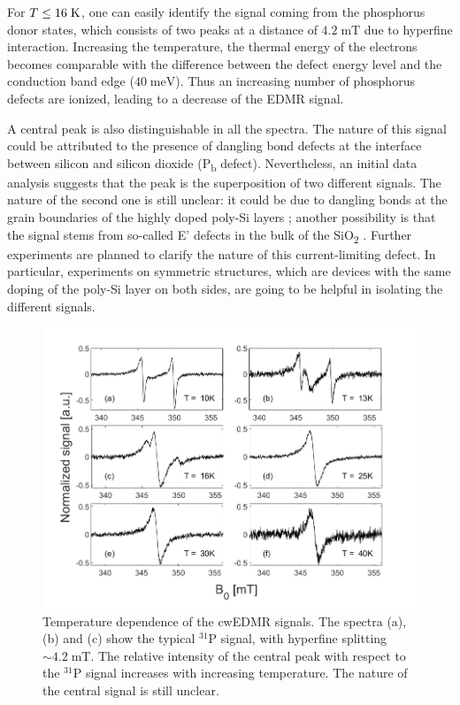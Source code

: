 \documentclass[a4paper]{book}
\newcommand{\tsub}{\textsubscript}
\begin{document}
	For $T \leq 16 \; \text K$, one can easily identify the signal coming from the phosphorus donor states, which consists of two peaks at a distance of $4.2 \; \text{mT}$ due to hyperfine interaction. Increasing the temperature, the thermal energy of the electrons 
	becomes comparable with the difference between the defect energy level and the conduction band edge ($40 \; \text{meV}$)\cite{feherElectronSpinResonance1959}. Thus an increasing number of phosphorus defects are ionized, leading to a decrease of the EDMR signal.
	
	A central peak is also distinguishable in all the spectra. The nature of this signal could be attributed to the presence of dangling bond defects at the interface between silicon and silicon dioxide (P\tsub b defect). Nevertheless, an initial data analysis suggests that the peak is the superposition of two different signals. The nature of the second one is still unclear: it could be due to dangling bonds at the grain boundaries of the highly doped poly-Si layers \cite{lipsDefectsRecombinationMicrocrystalline2003}; another possibility is that the signal stems from so-called E' defects in the bulk of the SiO\tsub 2 \cite{lenahanWhatCanElectron1998}\cite{ambalSpinRelaxationDynamicsCenters2015}. Further experiments are planned to clarify the nature of this current-limiting defect. In particular, experiments on symmetric structures, which are devices with the same doping of the poly-Si layer on both sides, are going to be helpful in isolating the different signals.\\
	\begin{figure}
		\centering
		\includegraphics[width=\textwidth]{images/4_cwEDMR_Tdependence.png}
		\caption{Temperature dependence of the cwEDMR signals. The spectra (a), (b) and (c) show the typical $^{31}$P signal, with hyperfine splitting $\sim 4.2 \; \text{mT}$. The relative intensity of the central peak with respect to the $^{31}$P signal increases with increasing temperature. The nature of the central signal is still unclear.}
		\label{fig:4_cwEDMR_Tdependence}
	\end{figure}
	
\end{document}
